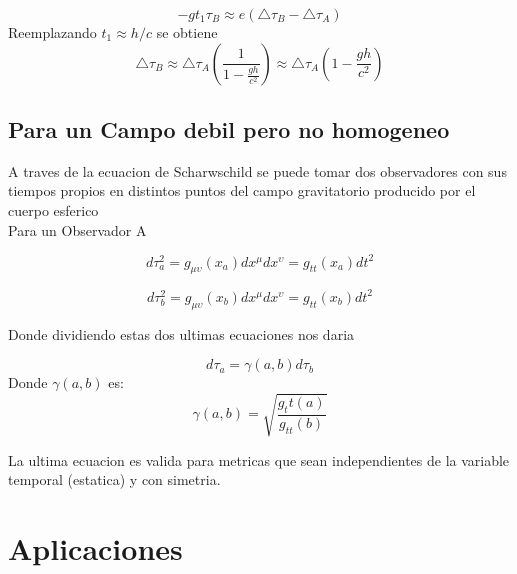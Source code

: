 \documentclass[12pt,twoside]{rif}
\begin{document}
\begin{equation}
-gt_{1}\tau_{B}\approx e(\triangle\tau_{B}-\triangle\tau_{A})
\end{equation}
Reemplazando $t_{1}\approx h/c$ se obtiene
\begin{equation}
\triangle\tau_{B}\approx\triangle\tau_{A}\left(\frac{1}{1-\frac{gh}{c^{2}}}\right)\approx\triangle\tau_{A}\left(1-\frac{gh}{c^{2}}\right)
\end{equation}
	\subsection{Para un Campo debil pero no homogeneo}
A traves de la ecuacion de Scharwschild se puede tomar dos observadores con sus tiempos propios en distintos puntos del campo gravitatorio producido por el cuerpo esferico\\
Para un Observador A

\begin{equation}
d\tau_{a}^{2}=g_{\mu\upsilon}(x_{a})dx^{\mu}dx^{\upsilon}=g_{tt}(x_{a})dt^{2}
\end{equation}

\begin{equation}
d\tau_{b}^{2}=g_{\mu\upsilon}(x_{b})dx^{\mu}dx^{\upsilon}=g_{tt}(x_{b})dt^{2}
\end{equation}

Donde dividiendo estas dos ultimas ecuaciones nos daria 

\begin{equation}
d\tau_{a} =\gamma(a,b) d\tau_{b}
\end{equation}		
Donde $\gamma(a,b)$ es: \\

\begin{equation}
\gamma(a,b)=\sqrt{\frac{g_tt(a)}{g_{tt}(b)}}
\end{equation}

La ultima ecuacion es valida para metricas que sean independientes de la variable temporal (estatica) y con simetria.	
	
	
\section{Aplicaciones}
	
\end{document}
